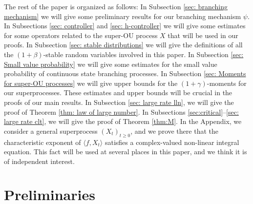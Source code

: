 \documentclass[12pt,a4paper]{amsart}
\theoremstyle{plain}
\theoremstyle{definition}
\numberwithin{equation}{section}
\begin{document}
The rest of the paper is organized as follows:
In Subsection \ref{sec: branching mechanism} we will give some preliminary results for our branching mechanism $\psi$.
In Subsections \ref{sec: controller} and \ref{sec: h-controller} we will give some estimates for some operators related to the super-OU process $X$ that will be used in our proofs.
In Subsection \ref{sec: stable distributions} we will give the definitions of all the $(1+\beta)$-stable random variables involved in this paper.
In Subsection \ref{sec: Small value probability} we will give some estimates for the small value probability of continuous state branching processes.
In Subsection \ref{sec: Moments for super-OU processes} we will give upper bounds for the $(1+\gamma)$-moments for our superprocesses.
These estimates and upper bounds will be crucial in the proofs of our main results.
In Subsection \ref{sec: large rate lln}, we will give the proof of Theorem \ref{thm: law of large number}.
In Subsections \ref{sec:critical}--\ref{sec: large rate clt}, we will give the proof of Theorem \ref{thm:M}.
In the Appendix, we consider a general superprocess $(X_t)_{t\geq 0}$, and we prove there that the characteristic exponent of $\langle f,X_t\rangle$ satisfies a complex-valued non-linear integral equation.
This fact will be used at several places in this paper, and we think it is of independent interest.

\section{Preliminaries}
\end{document}
